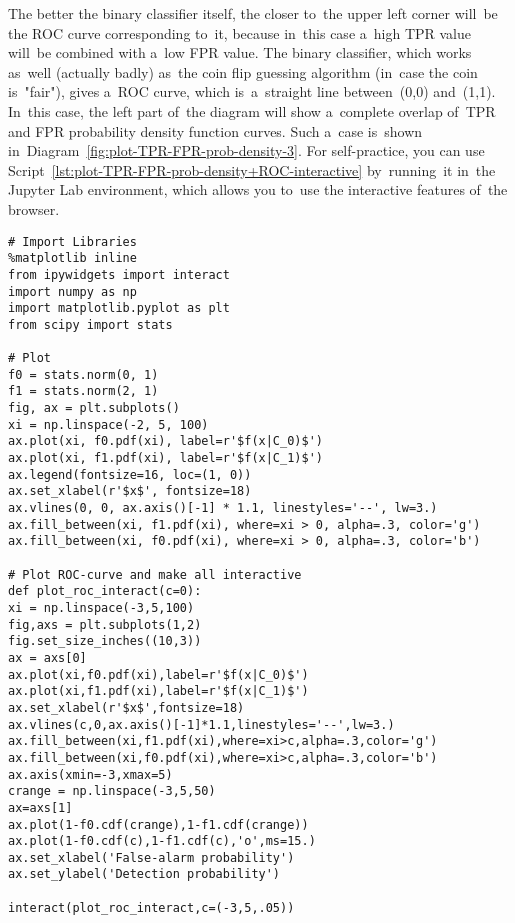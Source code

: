 \documentclass[]{scrreprt}
\begin{document}
The better the binary classifier itself, the closer to~the upper left corner will~be the ROC curve corresponding to~it, because in~this case a~high TPR value will~be combined with a~low FPR value. The binary classifier, which works as~well (actually badly) as~the coin flip guessing algorithm (in~case the coin is~"fair"), gives a~ROC curve, which is~a~straight line between~(0,0) and~(1,1). In~this case, the left part of~the diagram will show a~complete overlap of~TPR and FPR probability density function curves. Such a~case is~shown in~Diagram~\ref{fig:plot-TPR-FPR-prob-density-3}. For self-practice, you can use Script~\ref{lst:plot-TPR-FPR-prob-density+ROC-interactive} by~running~it in~the Jupyter Lab environment, which allows you to~use the interactive features of~the browser.
%
\begin{lstlisting}[float=htp, caption = Build an~interactive graph of~TPR and FPR distribution density and its corresponding ROC curve for a~given threshold value, firstnumber=1, label= lst:plot-TPR-FPR-prob-density+ROC-interactive]
# Import Libraries
%matplotlib inline
from ipywidgets import interact
import numpy as np
import matplotlib.pyplot as plt
from scipy import stats

# Plot
f0 = stats.norm(0, 1)
f1 = stats.norm(2, 1)
fig, ax = plt.subplots()
xi = np.linspace(-2, 5, 100)
ax.plot(xi, f0.pdf(xi), label=r'$f(x|C_0)$')
ax.plot(xi, f1.pdf(xi), label=r'$f(x|C_1)$')
ax.legend(fontsize=16, loc=(1, 0))
ax.set_xlabel(r'$x$', fontsize=18)
ax.vlines(0, 0, ax.axis()[-1] * 1.1, linestyles='--', lw=3.)
ax.fill_between(xi, f1.pdf(xi), where=xi > 0, alpha=.3, color='g')
ax.fill_between(xi, f0.pdf(xi), where=xi > 0, alpha=.3, color='b')

# Plot ROC-curve and make all interactive
def plot_roc_interact(c=0):
xi = np.linspace(-3,5,100)
fig,axs = plt.subplots(1,2)
fig.set_size_inches((10,3))
ax = axs[0]
ax.plot(xi,f0.pdf(xi),label=r'$f(x|C_0)$')
ax.plot(xi,f1.pdf(xi),label=r'$f(x|C_1)$')
ax.set_xlabel(r'$x$',fontsize=18)
ax.vlines(c,0,ax.axis()[-1]*1.1,linestyles='--',lw=3.)
ax.fill_between(xi,f1.pdf(xi),where=xi>c,alpha=.3,color='g')
ax.fill_between(xi,f0.pdf(xi),where=xi>c,alpha=.3,color='b')
ax.axis(xmin=-3,xmax=5)
crange = np.linspace(-3,5,50)
ax=axs[1]
ax.plot(1-f0.cdf(crange),1-f1.cdf(crange))
ax.plot(1-f0.cdf(c),1-f1.cdf(c),'o',ms=15.)
ax.set_xlabel('False-alarm probability')
ax.set_ylabel('Detection probability')

interact(plot_roc_interact,c=(-3,5,.05))

\end{lstlisting}
\end{document}
